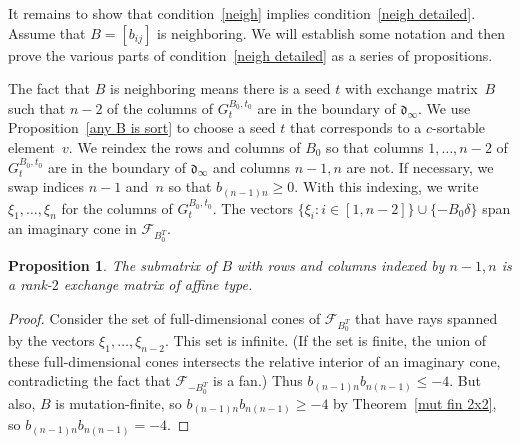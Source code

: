 \documentclass{amsart}
\newtheorem{proposition}{Proposition}[section]
\theoremstyle{definition}
\theoremstyle{remark}
\numberwithin{equation}{section}
\newcommand{\set}[1]{{\lbrace #1 \rbrace}}
\newcommand{\F}{{\mathcal F}}
\newcommand{\0}{{\mathbf{0}}}
\renewcommand{\d}{{\mathfrak d}}
\begin{document}
It remains to show that condition~\ref{neigh} implies condition~\ref{neigh detailed}.
Assume that ${B=[b_{ij}]}$ is neighboring.
We will establish some notation and then prove the various parts of condition~\ref{neigh detailed} as a series of propositions.

The fact that $B$ is neighboring means there is a seed $t$ with exchange matrix~$B$ such that $n-2$ of the columns of $G^{B_0,t_0}_t$ are in the boundary of $\d_\infty$.
We use Proposition~\ref{any B is sort} to choose a seed $t$ that corresponds to a $c$-sortable element~$v$.
We reindex the rows and columns of $B_0$ so that columns $1,\ldots,n-2$ of $G^{B_0,t_0}_t$ are in the boundary of $\d_\infty$ and columns $n-1,n$ are not.
If necessary, we swap indices $n-1$ and~$n$ so that $b_{(n-1)n}\ge0$.
With this indexing, we write $\xi_1,\ldots,\xi_n$ for the columns of $G^{B_0,t_0}_t$.
The vectors $\set{\xi_i:i\in[1,n-2]}\cup\set{-B_0\delta}$ span an imaginary cone in $\F_{B_0^T}$.

\begin{proposition}\label{B44 aff}
The submatrix of $B$ with rows and columns indexed by $n-1,n$ is a rank-$2$ exchange matrix of affine type.
\end{proposition}
\begin{proof}
Consider the set of full-dimensional cones of $\F_{B_0^T}$ that have rays spanned by the vectors $\xi_1,\ldots,\xi_{n-2}$. 
This set is infinite.
(If the set is finite, the union of these full-dimensional cones intersects the relative interior of an imaginary cone, contradicting the fact that $\F_{-B_0^T}$ is a fan.)
Thus ${b_{(n-1)n}b_{n(n-1)}\le-4}$.
But also, $B$ is mutation-finite, so $b_{(n-1)n}b_{n(n-1)}\ge-4$ by Theorem~\ref{mut fin 2x2}, so ${b_{(n-1)n}b_{n(n-1)}=-4}$.
\end{proof}
\end{document}

